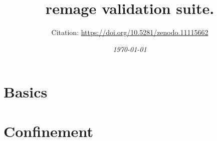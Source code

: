 \documentclass[a4paper,11pt]{article}
\title{{\Large \bf remage validation suite.}}
\author{{\normalsize Citation: \url{https://doi.org/10.5281/zenodo.11115662}}}
\date{{\it\normalsize \today}}  %
\begin{document}
\maketitle

\section{Basics}


\section{Confinement}

\end{document}
